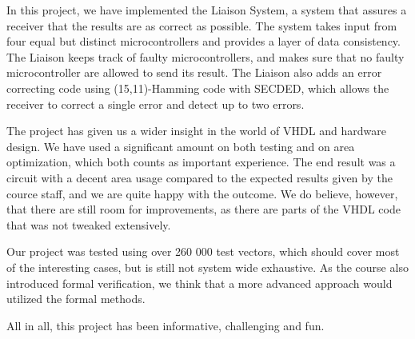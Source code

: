 In this project, we have implemented the Liaison System, a system that assures a receiver that the results are as correct as possible.
The system takes input from four equal but distinct microcontrollers and provides a layer of data consistency. The Liaison keeps track
of faulty microcontrollers, and makes sure that no faulty microcontroller are allowed to send its result. The Liaison also adds an error
correcting code using (15,11)-Hamming code with SECDED, which allows the receiver to correct a single error and detect up to two errors.

The project has given us a wider insight in the world of VHDL and hardware design. We have used a significant amount on both testing and
on area optimization, which both counts as important experience. The end result was a circuit with a decent area usage compared to the
expected results given by the cource staff, and we are quite happy with the outcome. We do believe, however, that there are still room for
improvements, as there are parts of the VHDL code that was not tweaked extensively.

Our project was tested using over 260 000 test vectors, which should cover most of the interesting cases, but is still not system wide
exhaustive. As the course also introduced formal verification, we think that a more advanced approach would utilized the formal methods.

All in all, this project has been informative, challenging and fun.
